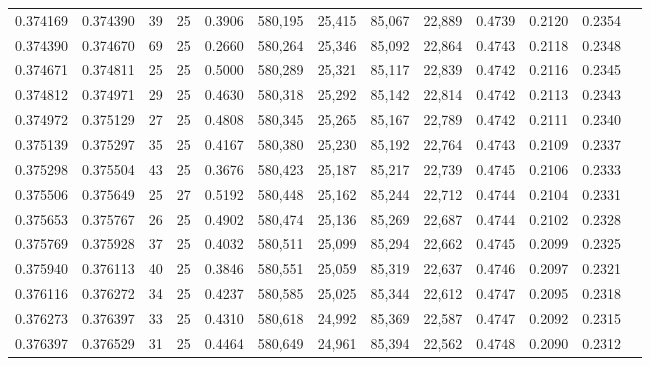 \begin{tabular}{rrrrrrrrrrrrr}
0.374169 & 0.374390 &    39 &  25 &                                     0.3906 & 580,195 &  25,415 &  85,067 &  22,889 & 0.4739 & 0.2120 & 0.2354 \\
0.374390 & 0.374670 &    69 &  25 &                                     0.2660 & 580,264 &  25,346 &  85,092 &  22,864 & 0.4743 & 0.2118 & 0.2348 \\
0.374671 & 0.374811 &    25 &  25 &                                     0.5000 & 580,289 &  25,321 &  85,117 &  22,839 & 0.4742 & 0.2116 & 0.2345 \\
0.374812 & 0.374971 &    29 &  25 &                                     0.4630 & 580,318 &  25,292 &  85,142 &  22,814 & 0.4742 & 0.2113 & 0.2343 \\
0.374972 & 0.375129 &    27 &  25 &                                     0.4808 & 580,345 &  25,265 &  85,167 &  22,789 & 0.4742 & 0.2111 & 0.2340 \\
0.375139 & 0.375297 &    35 &  25 &                                     0.4167 & 580,380 &  25,230 &  85,192 &  22,764 & 0.4743 & 0.2109 & 0.2337 \\
0.375298 & 0.375504 &    43 &  25 &                                     0.3676 & 580,423 &  25,187 &  85,217 &  22,739 & 0.4745 & 0.2106 & 0.2333 \\
0.375506 & 0.375649 &    25 &  27 &                                     0.5192 & 580,448 &  25,162 &  85,244 &  22,712 & 0.4744 & 0.2104 & 0.2331 \\
0.375653 & 0.375767 &    26 &  25 &                                     0.4902 & 580,474 &  25,136 &  85,269 &  22,687 & 0.4744 & 0.2102 & 0.2328 \\
0.375769 & 0.375928 &    37 &  25 &                                     0.4032 & 580,511 &  25,099 &  85,294 &  22,662 & 0.4745 & 0.2099 & 0.2325 \\
0.375940 & 0.376113 &    40 &  25 &                                     0.3846 & 580,551 &  25,059 &  85,319 &  22,637 & 0.4746 & 0.2097 & 0.2321 \\
0.376116 & 0.376272 &    34 &  25 &                                     0.4237 & 580,585 &  25,025 &  85,344 &  22,612 & 0.4747 & 0.2095 & 0.2318 \\
0.376273 & 0.376397 &    33 &  25 &                                     0.4310 & 580,618 &  24,992 &  85,369 &  22,587 & 0.4747 & 0.2092 & 0.2315 \\
0.376397 & 0.376529 &    31 &  25 &                                     0.4464 & 580,649 &  24,961 &  85,394 &  22,562 & 0.4748 & 0.2090 & 0.2312 \\

\end{tabular}
